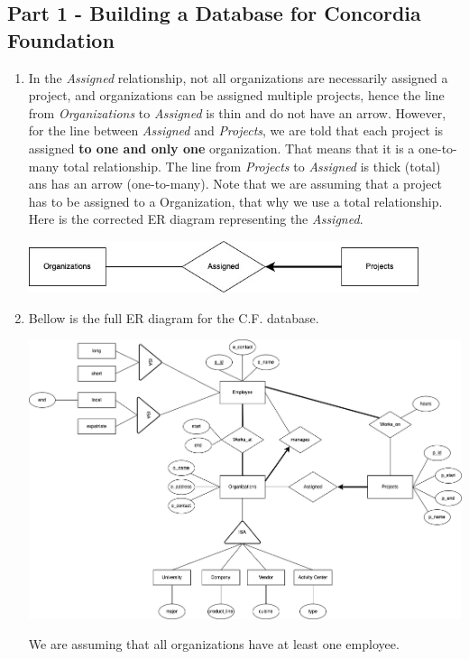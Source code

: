 \newpage
\subsection*{Part 1 - Building a Database for Concordia Foundation}

\begin{enumerate}[label={(\alph*)}]
    \item In the \textit{Assigned} relationship, not all organizations are necessarily assigned a project, and organizations can be assigned multiple projects, hence the line from \textit{Organizations} to \textit{Assigned} is thin and do not have an arrow. However, for the line between \textit{Assigned} and \textit{Projects}, we are told that each project is assigned \textbf{to one and only one} organization. That means that it is a one-to-many total relationship. The line from \textit{Projects} to \textit{Assigned} is thick (total) ans has an arrow (one-to-many). Note that we are assuming that a project has to be assigned to a Organization, that why we use a total relationship. Here is the corrected ER diagram representing the \textit{Assigned}. 
    
    \begin{center}
        \includegraphics[width=0.9\textwidth]{img/1a.jpg}
    \end{center}
    
    \item Bellow is the full ER diagram for the C.F. database.
    \begin{center}
        \includegraphics[width=1\textwidth]{img/1b.png}
    \end{center}
    We are assuming that all organizations have at least one employee. 
    

\end{enumerate}
